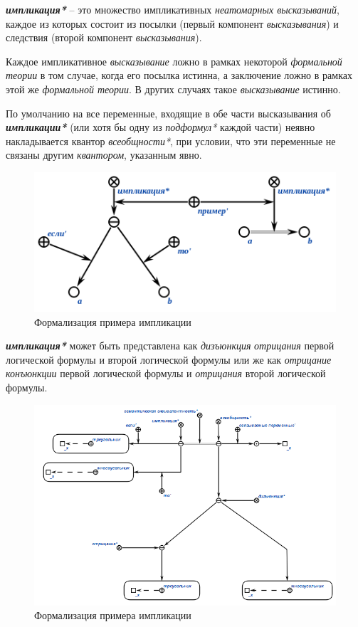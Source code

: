 \textbf{\textit{импликация*}} -- это множество импликативных \textit{неатомарных высказываний}, каждое из которых состоит из посылки (первый компонент \textit{высказывания}) и следствия (второй компонент \textit{высказывания}).

Каждое импликативное \textit{высказывание} ложно в рамках некоторой \textit{формальной теории} в том случае, когда его посылка истинна, а заключение ложно в рамках этой же \textit{формальной теории}. В других случаях такое \textit{высказывание} истинно.

По умолчанию на все переменные, входящие в обе части высказывания об \textbf{\textit{импликации*}} (или хотя бы одну из \textit{подформул*} каждой части) неявно накладывается квантор \textit{всеобщности*}, при условии, что эти переменные не связаны другим \textit{квантором}, указанным явно.

\begin{figure}[http]
\includegraphics[scale=0.8]{author/part2/figures/logic/implication.png}
\caption{Формализация примера импликации}
\label{fig:implication}
\end{figure}

\textbf{\textit{импликация*}} может быть представлена как \textit{дизъюнкция} \textit{отрицания} первой логической формулы и второй логической формулы или же как \textit{отрицание} \textit{конъюнкции} первой логической формулы и \textit{отрицания} второй логической формулы.

\begin{figure}[http]
	\includegraphics[scale=0.8]{author/part2/figures/logic/implication_representation.png}
	\caption{Формализация примера импликации}
	\label{fig:implication_representation}
\end{figure}

